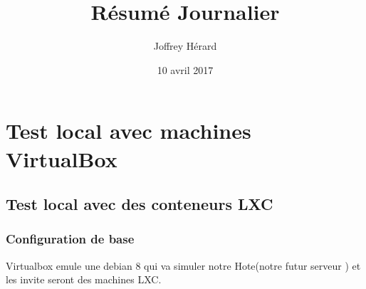 \documentclass[french]{article}
\begin{document}
\title{Résumé Journalier}
\author{Joffrey Hérard}
\date{10 avril 2017} 

\maketitle
\section{Test local avec machines VirtualBox}
\subsection{Test local avec des conteneurs LXC}
\subsubsection{Configuration de base}
Virtualbox emule une debian 8 qui va simuler notre Hote(notre futur serveur ) et les invite seront des machines LXC.
\end{document}
